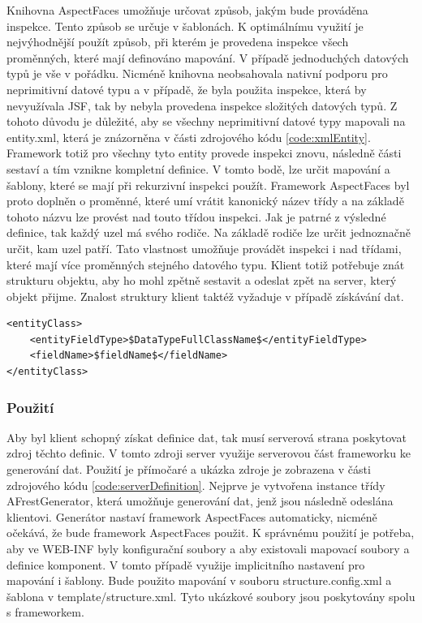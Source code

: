 Knihovna AspectFaces umožňuje určovat způsob, jakým bude prováděna inspekce. Tento způsob se určuje v šablonách. K optimálnímu využití je nejvýhodnější použít způsob, při kterém je provedena inspekce všech proměnných, které mají definováno mapování. V případě jednoduchých datových typů je vše v pořádku. Nicméně knihovna neobsahovala nativní podporu pro neprimitivní datové typu a v případě, že byla použita inspekce, která by nevyužívala JSF, tak by nebyla provedena inspekce složitých datových typů. Z tohoto důvodu je důležité, aby se všechny neprimitivní datové typy mapovali na entity.xml, která je znázorněna v části zdrojového kódu \ref{code:xmlEntity}. Framework totiž pro všechny tyto entity provede inspekci znovu, následně části sestaví a tím vznikne kompletní definice. V tomto bodě, lze určit mapování a šablony, které se mají při rekurzivní inspekci použít. Framework AspectFaces byl proto doplněn o proměnné, které umí vrátit kanonický název třídy a na základě tohoto názvu lze provést nad touto třídou inspekci. Jak je patrné z výsledné definice, tak každý uzel má svého rodiče. Na základě rodiče lze určit jednoznačně určit, kam uzel patří. Tato vlastnost umožňuje provádět inspekci i nad třídami, které mají více proměnných stejného datového typu. Klient totiž potřebuje znát strukturu objektu, aby ho mohl zpětně sestavit a odeslat zpět na server, který objekt přijme. Znalost struktury klient taktéž vyžaduje v případě získávání dat.
\begin{lstlisting}[caption=Ukázka definice neprimitivního datového typu,
label={code:xmlEntity}]
<entityClass>
	<entityFieldType>$DataTypeFullClassName$</entityFieldType>
	<fieldName>$fieldName$</fieldName>
</entityClass>
\end{lstlisting}
\subsubsection{Použití}
Aby byl klient schopný získat definice dat, tak musí serverová strana poskytovat zdroj těchto definic. V tomto zdroji server využije serverovou část frameworku ke generování dat. Použití je přímočaré a ukázka zdroje je zobrazena v části zdrojového kódu \ref{code:serverDefinition}. Nejprve je vytvořena instance třídy AFrestGenerator, která umožňuje generování dat, jenž jsou následně odeslána klientovi. Generátor nastaví framework AspectFaces automaticky, nicméně očekává, že bude framework AspectFaces použit. K správnému použití je potřeba, aby ve WEB-INF byly konfigurační soubory a aby existovali mapovací soubory a definice komponent. V tomto případě využije implicitního nastavení pro mapování i šablony. Bude použito mapování v souboru structure.config.xml a šablona v template/structure.xml. Tyto ukázkové soubory jsou poskytovány spolu s frameworkem.

